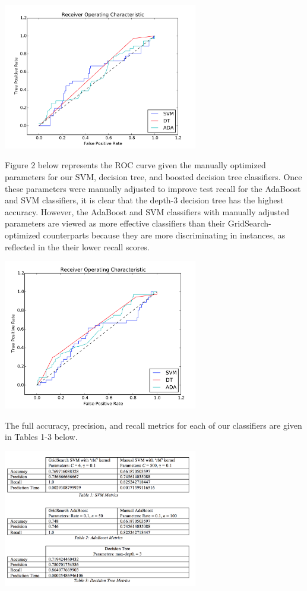 \documentclass{article}
\begin{document}
\includegraphics[width=8.5cm]{ROC}

Figure 2 below represents the ROC curve given the manually optimized parameters for our SVM, decision tree, and boosted decision tree classifiers. Once these parameters were manually adjusted to improve test recall for the AdaBoost and SVM classifiers, it is clear that the depth-3 decision tree has the highest accuracy. However, the AdaBoost and SVM classifiers with manually adjusted parameters are viewed as more effective classifiers than their GridSearch-optimized counterparts because they are more discriminating in instances, as reflected in the their lower recall scores.

\includegraphics[width=8.5cm]{ROC2}

The full accuracy, precision, and recall metrics for each of our classifiers are given in Tables 1-3 below.

\includegraphics[width=8.5cm]{tables}
\end{document}
